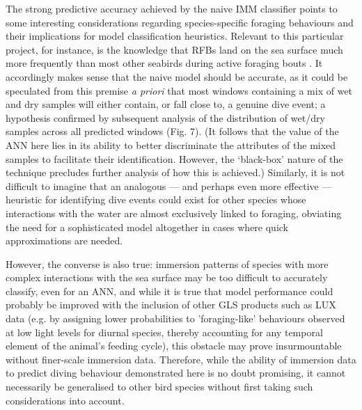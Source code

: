 \documentclass[11pt]{article}
\begin{document}

    The strong predictive accuracy achieved by the naive IMM classifier points to some interesting considerations regarding species-specific foraging behaviours and their implications for model classification heuristics. Relevant to this particular project, for instance, is the knowledge that RFBs land on the sea surface much more frequently than most other seabirds during active foraging bouts \citep{weimerskirch2005three}. It accordingly makes sense that the naive model should be accurate, as it could be speculated from this premise \emph{a priori} that most windows containing a mix of wet and dry samples will either contain, or fall close to, a genuine dive event; a hypothesis confirmed by subsequent analysis of the distribution of wet/dry samples across all predicted windows (Fig. 7). (It follows that the value of the ANN here lies in its ability to better discriminate the attributes of the mixed samples to facilitate their identification. However, the ‘black-box’ nature of the technique precludes further analysis of how this is achieved.) Similarly, it is not difficult to imagine that an analogous — and perhaps even more effective — heuristic for identifying dive events could exist for other species whose interactions with the water are almost exclusively linked to foraging, obviating the need for a sophisticated model altogether in cases where quick approximations are needed. 
    
    However, the converse is also true: immersion patterns of species with more complex interactions with the sea surface may be too difficult to accurately classify, even for an ANN, and while it is true that model performance could probably be improved with the inclusion of other GLS products such as LUX data (e.g. by assigning lower probabilities to 'foraging-like' behaviours observed at low light levels for diurnal species, thereby accounting for any temporal element of the animal's feeding cycle), this obstacle may prove insurmountable without finer-scale immersion data. Therefore, while the ability of immersion data to predict diving behaviour demonstrated here is no doubt promising, it cannot necessarily be generalised to other bird species without first taking such considerations into account.
    
\end{document}
